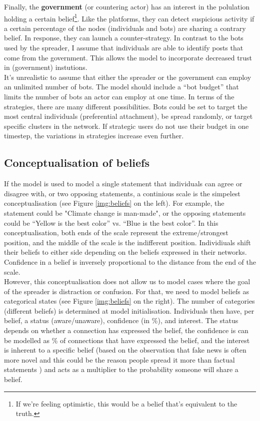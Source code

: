 \documentclass[10pt,a4paper]{article}
\begin{document}
Finally, the \textbf{government} (or countering actor) has an interest in the polulation holding a certain belief\footnote{If we're feeling optimistic, this would be a belief that's equivalent to the truth.}. Like the platforms, they can detect suspicious activity if a certain percentage of the nodes (individuals and bots) are sharing a contrary belief. In response, they can launch a counter-strategy. In contrast to the bots used by the spreader, I assume that individuals are able to identify posts that come from the government. This allows the model to incorporate decreased trust in (government) instutions. \\

It's unrealistic to assume that either the spreader or the government can employ an unlimited number of bots. The model should include a ``bot budget'' that limits the number of bots an actor can employ at one time. In terms of the strategies, there are many different possibilities. Bots could be set to target the most central individuals (preferential attachment), be spread randomly, or target specific clusters in the network. If strategic users do not use their budget in one timestep, the variations in strategies increase even further. 

\subsection{Conceptualisation of beliefs} \label{beliefs}
If the model is used to model a single statement that individuals can agree or disagree with, or two opposing statements, a continious scale is the simpelest conceptualisation (see Figure \ref{img:beliefs} on the left). For example, the statement could be "Climate change is man-made", or the opposing statements could be ``Yellow is the best color'' vs. ``Blue is the best color''. In this conceptualisation, both ends of the scale represent the extreme/strongest position, and the middle of the scale is the indifferent position. Individiuals shift their beliefs to either side depending on the beliefs expressed in their networks. Confidence in a belief is inversely proportional to the distance from the end of the scale. \\

However, this conceptualisation does not allow us to model cases where the goal of the spreader is distraction or confusion. For that, we need to model beliefs as categorical states (see Figure \ref{img:beliefs} on the right). The number of categories (different beliefs) is determined at model initialisation. Individuals then have, per belief, a status (aware/unaware), confidence (in \%), and interest. The status depends on whether a connection has expressed the belief, the confidence is can be modelled as \% of connections that have expressed the belief, and the interest is inherent to a specific belief (based on the observation that fake news is often more novel and this could be the reason people spread it more than factual statements \cite{Vosoughi2018}) and acts as a multiplier to the probability someone will share a belief.\\
\end{document}
